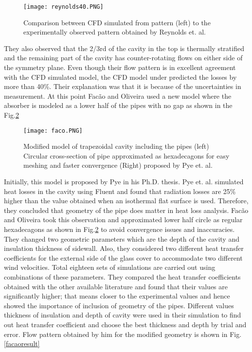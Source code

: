\begin{figure}[H]
\begin{center}
\texttt{[image: reynolds40.PNG]}
\caption{Comparison between CFD simulated from pattern
(left) to the experimentally observed pattern obtained by
Reynolds et. al.\citep{REYNOLDS2004229}}
\label{rey}
\end{center}
\end{figure}

They also observed that the 2/3rd of the cavity in the top is thermally stratified and the remaining part of the cavity has counter-rotating flows on either side of the symmetry plane. Even though their flow pattern is in excellent agreement with the CFD simulated model, the CFD model under predicted the losses by more than 40\%. Their explanation was that it is because of the uncertainties in measurement. At this point Fac\~ao and Oliveira\citep{FACAO201190} used a new model where the absorber is modeled as a lower half of the pipes with no gap as shown in the Fig.\ref{facao}

\begin{figure}[H]
\begin{center}
\texttt{[image: faco.PNG]}
\caption{Modified model of trapezoidal cavity including the pipes (left) Circular cross-section of pipe approximated
as hexadecagons for easy meshing and faster convergence (Right) proposed by Pye et. al.\citep{pye2003modelling}}
\label{facao}
\end{center}
\end{figure}

Initially, this model is proposed by Pye in his Ph.D. thesis\citep{pye2008system}. Pye et. al.\citep{pye2003modelling} simulated heat losses in the cavity using Fluent and found that radiation losses are 25\% higher than the value obtained when an isothermal flat surface is used. Therefore, they concluded that geometry of the pipe does matter in heat loss analysis. Fac\~ao and Oliveira\citep{FACAO201190} took this observation and approximated lower half circle as regular hexadecagons as shown in Fig.\ref{facao} to avoid convergence issues and inaccuracies. They changed two geometric parameters which are the depth of the cavity and insulation thickness of sidewall. Also, they considered two different heat transfer coefficients for the external side of the glass cover to accommodate two different wind velocities. Total eighteen sets of simulations are carried out using combinations of these parameters. They compared the heat transfer coefficients obtained with the other available literature and found that their values are significantly higher; that means closer to the experimental values and hence showed the importance of inclusion of geometry of the pipes. Different values thickness of insulation and depth of cavity were used in their simulation to find out heat transfer coefficient and choose the best thickness and depth by trial and error. Flow pattern obtained by him for the modified geometry is shown in Fig.\ref{facaoresult}


